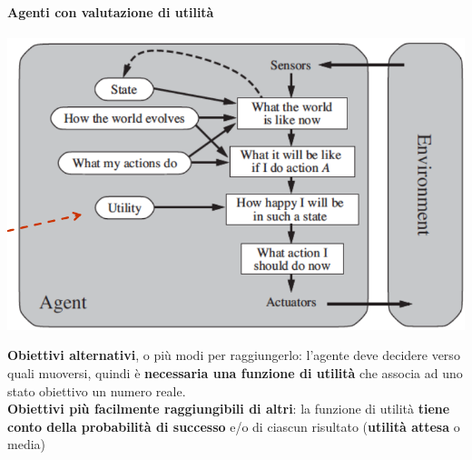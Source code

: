 \documentclass[10pt]{book}
\begin{document}
\paragraph{Agenti con valutazione di utilità}
\begin{center}
	\includegraphics[scale=0.5]{agvalutazutilita.png}
\end{center}
\textbf{Obiettivi alternativi}, o più modi per raggiungerlo: l'agente deve decidere verso quali muoversi, quindi è \textbf{necessaria una funzione di utilità} che associa ad uno stato obiettivo un numero reale.\\
\textbf{Obiettivi più facilmente raggiungibili di altri}: la funzione di utilità \textbf{tiene conto della probabilità di successo} e/o di ciascun risultato (\textbf{utilità attesa} o media)
\pagebreak
\end{document}
